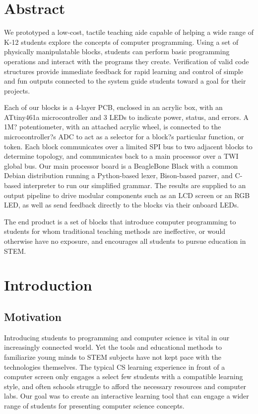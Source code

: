 \documentclass[12pt,a4paper]{article}
\begin{document}
\section{Abstract}
We prototyped a low-cost, tactile teaching aide capable of helping a wide range of K-12 students explore the concepts of computer programming. Using a set of physically manipulatable blocks, students can perform basic programming operations and interact with the programs they create. Verification of valid code structures provide immediate feedback for rapid learning and control of simple and fun outputs connected to the system guide students toward a goal for their projects. 

Each of our blocks is a 4-layer PCB, enclosed in an acrylic box, with an ATtiny461a microcontroller and 3 LEDs to indicate power, status, and errors. A 1M? potentiometer, with an attached acrylic wheel, is connected to the microcontroller?s ADC to act as a selector for a block?s particular function, or token. Each block communicates over a limited SPI bus to two adjacent blocks to determine topology, and communicates back to a main processor over a TWI global bus. Our main processor board is a BeagleBone Black with a common Debian distribution running a Python-based lexer, Bison-based parser, and C-based interpreter to run our simplified grammar. The results are supplied to an output pipeline to drive modular components such as an LCD screen or an RGB LED, as well as send feedback directly to the blocks via their onboard LEDs. 


The end product is a set of blocks that introduce computer programming to students for whom traditional teaching methods are ineffective, or would otherwise have no exposure, and encourages all students to pursue education in STEM.

\section{Introduction}
\subsection{Motivation}
Introducing students to programming and computer science is vital in our increasingly connected world. Yet the tools and educational methods to familiarize young minds to STEM subjects have not kept pace with the technologies themselves. The typical CS learning experience in front of a computer screen only engages a select few students with a compatible learning style, and often schools struggle to afford the necessary resources and computer labs. Our goal was to create an interactive learning tool that can engage a wider range of students for presenting computer science concepts.
\end{document}
